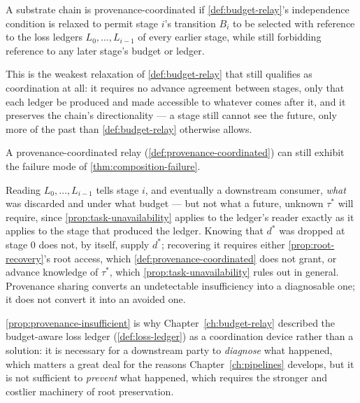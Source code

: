 \begin{definition}
\label{def:provenance-coordinated}
A substrate chain is provenance-coordinated if \cref{def:budget-relay}'s
independence condition is relaxed to permit stage $i$'s transition $B_i$
to be selected with reference to the loss ledgers $L_0, \ldots, L_{i-1}$
of every earlier stage, while still forbidding reference to any later
stage's budget or ledger.
\end{definition}

This is the weakest relaxation of \cref{def:budget-relay} that still
qualifies as coordination at all: it requires no advance agreement
between stages, only that each ledger be produced and made accessible to
whatever comes after it, and it preserves the chain's directionality ---
a stage still cannot see the future, only more of the past than
\cref{def:budget-relay} otherwise allows.

\begin{proposition}
\label{prop:provenance-insufficient}
A provenance-coordinated relay (\cref{def:provenance-coordinated}) can
still exhibit the failure mode of \cref{thm:composition-failure}.
\end{proposition}

\begin{proofsketch}
Reading $L_0, \ldots, L_{i-1}$ tells stage $i$, and eventually a
downstream consumer, \emph{what} was discarded and under what budget ---
but not what a future, unknown $\tau^*$ will require, since
\cref{prop:task-unavailability} applies to the ledger's reader exactly as
it applies to the stage that produced the ledger. Knowing that $d^*$ was
dropped at stage $0$ does not, by itself, supply $d^*$; recovering it
requires either \cref{prop:root-recovery}'s root access, which
\cref{def:provenance-coordinated} does not grant, or advance knowledge of
$\tau^*$, which \cref{prop:task-unavailability} rules out in general.
Provenance sharing converts an undetectable insufficiency into a
diagnosable one; it does not convert it into an avoided one.
\end{proofsketch}

\cref{prop:provenance-insufficient} is why Chapter~\ref{ch:budget-relay}
described the budget-aware loss ledger (\cref{def:loss-ledger}) as a
coordination device rather than a solution: it is necessary for a
downstream party to \emph{diagnose} what happened, which matters a great
deal for the reasons Chapter~\ref{ch:pipelines} develops, but it is not
sufficient to \emph{prevent} what happened, which requires the stronger
and costlier machinery of root preservation.


